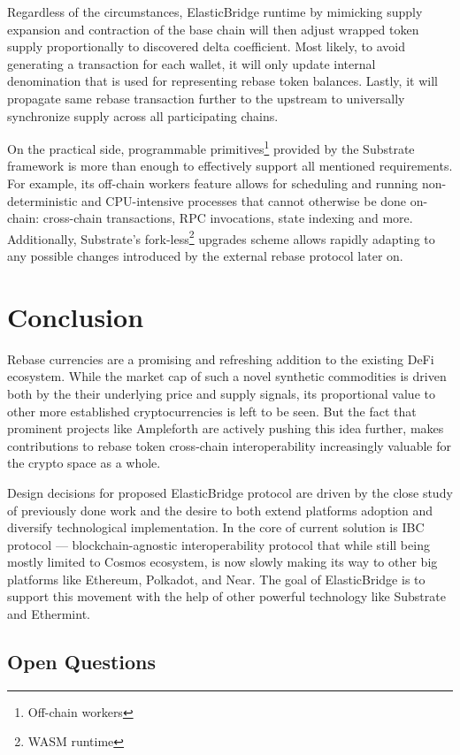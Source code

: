 \documentclass{article}
\begin{document}
Regardless of the circumstances, ElasticBridge runtime by mimicking supply expansion and contraction of the base chain will then adjust wrapped token supply proportionally to discovered delta coefficient. Most likely, to avoid generating a transaction for each wallet, it will only update internal denomination that is used for representing rebase token balances. Lastly, it will propagate same rebase transaction further to the upstream to universally synchronize supply across all participating chains.

On the practical side, programmable primitives\footnote{Off-chain workers} provided by the Substrate framework is more than enough to effectively support all mentioned requirements. For example, its off-chain workers feature allows for scheduling and running non-deterministic and CPU-intensive processes that cannot otherwise be done on-chain: cross-chain transactions, RPC invocations, state indexing and more. Additionally, Substrate's fork-less\footnote{WASM runtime} upgrades scheme allows rapidly adapting to any possible changes introduced by the external rebase protocol later on.

\section{Conclusion}

Rebase currencies are a promising and refreshing addition to the existing DeFi ecosystem. While the market cap of such a novel synthetic commodities is driven both by the their underlying price and supply signals, its proportional value to other more established cryptocurrencies is left to be seen. But the fact that prominent projects like Ampleforth are actively pushing this idea further, makes contributions to rebase token cross-chain interoperability increasingly valuable for the crypto space as a whole.

Design decisions for proposed ElasticBridge protocol are driven by the close study of previously done work and the desire to both extend platforms adoption and diversify technological implementation. In the core of current solution is IBC protocol --- blockchain-agnostic interoperability protocol that while still being mostly limited to Cosmos ecosystem, is now slowly making its way to other big platforms like Ethereum, Polkadot, and Near. The goal of ElasticBridge is to support this movement with the help of other powerful technology like Substrate and Ethermint.

\subsection{Open Questions}
\end{document}
